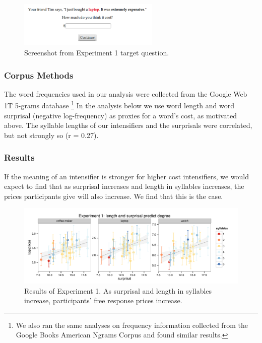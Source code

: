 \documentclass[a4paper,10pt]{article}
\newcommand{\todo}[1]{{\color{red}#1}}
\begin{document}
      \begin{figure}[ht]
      \begin{center}
      \includegraphics[width=0.6\textwidth]{exp1-q.png}
      \end{center}
      \caption{Screenshot from Experiment 1 target question.} 
      \label{exp1-q}
      \end{figure}

    \subsubsection{Corpus Methods}
      The word frequencies used in our analysis were collected from the Google Web 1T 5-grams database \cite{web1t5gram}\footnote{
      We also ran the same analyses on frequency information collected from the Google Books American Ngrams Corpus \cite{books2011} and found similar results.
      }
      In the analysis below we use word length and word surprisal (negative log-frequency) as proxies for a word's cost, as motivated above.
      The syllable lengths of our intensifiers and the surprisals %
      were correlated, but not strongly so (r = 0.27).

    \subsubsection{Results}
      If the meaning of an intensifier is stronger for higher cost intensifiers, we would expect to find that as surprisal increases and length in syllables increases, the prices participants give will also increase. We find that this is the case.

      \begin{figure}[ht]
      \begin{center}
      \includegraphics[width=\textwidth]{exp1.pdf}
      \end{center}
      \caption{Results of Experiment 1. As surprisal and length in syllables increase, participants' free response prices increase.} 
      \label{exp1-plot}
      \end{figure}
\end{document}

